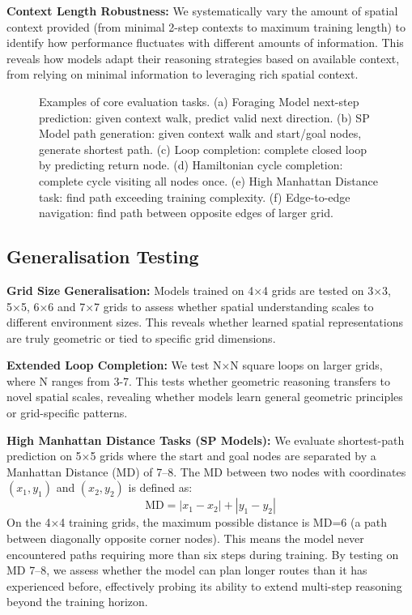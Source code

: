 \textbf{Context Length Robustness:} We systematically vary the amount of spatial context provided (from minimal 2-step contexts to maximum training length) to identify how performance fluctuates with different amounts of information. This reveals how models adapt their reasoning strategies based on available context, from relying on minimal information to leveraging rich spatial context. 

\begin{figure}[h]
\centering
\caption[Examples of core evaluation tasks.]{Examples of core evaluation tasks. (a) Foraging Model next-step prediction: given context walk, predict valid next direction. (b) SP Model path generation: given context walk and start/goal nodes, generate shortest path. (c) Loop completion: complete closed loop by predicting return node. (d) Hamiltonian cycle completion: complete cycle visiting all nodes once. (e) High Manhattan Distance task: find path exceeding training complexity. (f) Edge-to-edge navigation: find path between opposite edges of larger grid.}
\label{fig:evaluation_tasks}
\end{figure}

\subsection{Generalisation Testing}

\textbf{Grid Size Generalisation:} Models trained on 4×4 grids are tested on 3×3, 5×5, 6×6 and 7×7 grids to assess whether spatial understanding scales to different environment sizes. This reveals whether learned spatial representations are truly geometric or tied to specific grid dimensions.

\textbf{Extended Loop Completion:} We test N×N square loops on larger grids, where N ranges from 3-7. This tests whether geometric reasoning transfers to novel spatial scales, revealing whether models learn general geometric principles or grid-specific patterns.

\textbf{High Manhattan Distance Tasks (SP Models):} We evaluate shortest-path prediction on 5×5 grids where the start and goal nodes are separated by a Manhattan Distance (MD) of 7–8. The MD between two nodes with coordinates $(x_1, y_1)$ and $(x_2, y_2)$ is defined as:
\begin{equation}
\text{MD} = |x_1 - x_2| + |y_1 - y_2|
\end{equation}
On the 4×4 training grids, the maximum possible distance is MD=6 (a path between diagonally opposite corner nodes). This means the model never encountered paths requiring more than six steps during training. By testing on MD 7–8, we assess whether the model can plan longer routes than it has experienced before, effectively probing its ability to extend multi-step reasoning beyond the training horizon.


